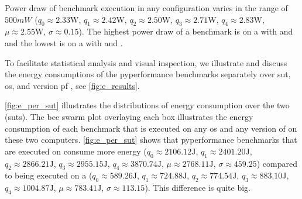 Power draw of benchmark execution in any configuration varies in the range of $500mW$
($q_{0} \approx 2.33\unit{\watt}$,
$q_{1} \approx 2.42\unit{\watt}$,
$q_{2} \approx 2.50\unit{\watt}$,
$q_{3} \approx 2.71\unit{\watt}$,
$q_{4} \approx 2.83\unit{\watt}$,
$\mu \approx 2.55\unit{\watt}$,
$\sigma \approx 0.15$).
The highest power draw of a benchmark is on a  with  and  and the lowest is on a  with  and .

To facilitate statistical analysis and visual inspection, we illustrate and discuss the energy consumptions of the \gls{pyperformance} benchmarks separately over \gls{sut}, \gls{os}, and version pf \python, see \autoref{fig:e_results}.

\autoref{fig:e_per_sut} illustrates the distributions of energy consumption over the two  (\glspl{sut}).
The bee swarm plot overlaying each box illustrates the energy consumption of each benchmark that is executed on any \gls{os} and any version of \python on these two computers.
\autoref{fig:e_per_sut} shows that \gls{pyperformance} benchmarks that are executed on  consume more energy
($q_{0} \approx 2106.12\unit{\joule}$,
$q_{1} \approx 2401.20\unit{\joule}$,
$q_{2} \approx 2866.21\unit{\joule}$,
$q_{3} \approx 2955.15\unit{\joule}$,
$q_{4} \approx 3870.74\unit{\joule}$,
$\mu \approx 2768.11\unit{\joule}$,
$\sigma \approx459.25$)
compared to being executed on a 
($q_{0} \approx  589.26\unit{\joule}$,
$q_{1} \approx  724.88\unit{\joule}$,
$q_{2} \approx  774.54\unit{\joule}$,
$q_{3} \approx  883.10\unit{\joule}$,
$q_{4} \approx 1004.87\unit{\joule}$,
$\mu \approx 783.41\unit{\joule}$,
$\sigma \approx113.15$).
This difference is quite big.


